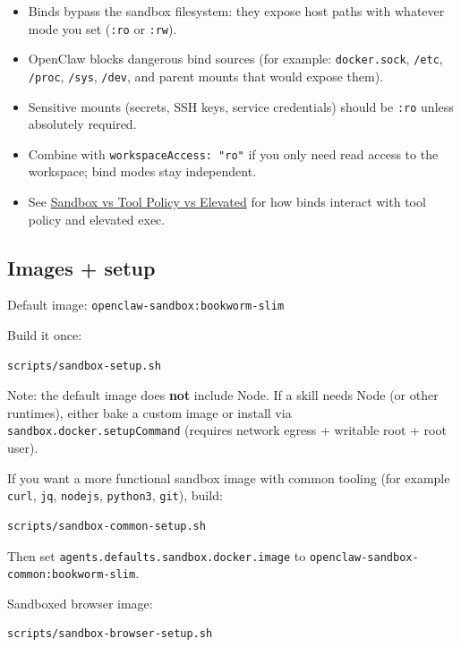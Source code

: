 \begin{itemize}
  \item Binds bypass the sandbox filesystem: they expose host paths with whatever mode you set (\texttt{:ro} or \texttt{:rw}).
  \item OpenClaw blocks dangerous bind sources (for example: \texttt{docker.sock}, \texttt{/etc}, \texttt{/proc}, \texttt{/sys}, \texttt{/dev}, and parent mounts that would expose them).
  \item Sensitive mounts (secrets, SSH keys, service credentials) should be \texttt{:ro} unless absolutely required.
  \item Combine with \texttt{workspaceAccess: "ro"} if you only need read access to the workspace; bind modes stay independent.
  \item See \href{/gateway/sandbox-vs-tool-policy-vs-elevated}{Sandbox vs Tool Policy vs Elevated} for how binds interact with tool policy and elevated exec.
\end{itemize}


\subsection{Images + setup}


Default image: \texttt{openclaw-sandbox:bookworm-slim}

Build it once:

\begin{lstlisting}[language=bash]
scripts/sandbox-setup.sh
\end{lstlisting}


Note: the default image does \textbf{not} include Node. If a skill needs Node (or
other runtimes), either bake a custom image or install via
\texttt{sandbox.docker.setupCommand} (requires network egress + writable root +
root user).

If you want a more functional sandbox image with common tooling (for example
\texttt{curl}, \texttt{jq}, \texttt{nodejs}, \texttt{python3}, \texttt{git}), build:

\begin{lstlisting}[language=bash]
scripts/sandbox-common-setup.sh
\end{lstlisting}


Then set \texttt{agents.defaults.sandbox.docker.image} to
\texttt{openclaw-sandbox-common:bookworm-slim}.

Sandboxed browser image:

\begin{lstlisting}[language=bash]
scripts/sandbox-browser-setup.sh
\end{lstlisting}


